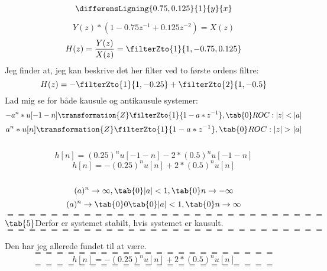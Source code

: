 \begin{Opgaver}
\begin{kapitel}[Z transformation]
\begin{Opgave}
            
        \end{Opgave}
        \begin{Opgave}
            \[\differensLigning{0.75, 0.125}{1}{y}{x}\]            
            \begin{UnderOpgave}
                \[Y(z)*(1 - 0.75z^{-1} + 0.125z^{-2}) = X(z)\]
                \[H(z) = \frac{Y(z)}{X(z)} = \filterZto{1}{1, -0.75, 0.125}\]
                Jeg finder at, jeg kan beskrive det her filter ved to første ordens filtre: 
                \[H(z) = -\filterZto{1}{1, -0.25} + \filterZto{2}{1, -0.5}\]
                Lad mig se for både kausule og antikausule systemer: 
                \[-a^n*u[-1-n]  \transformation{Z} \filterZto{1}{1 - a*z^{-1}},\tab{0} ROC: |z| < |a|\]
                \[ a^n*u[n]     \transformation{Z} \filterZto{1}{1 - a*z^{-1}}, \tab{0} ROC: |z| > |a|\]\\
                \[h[n] = (0.25)^nu[-1-n] - 2*(0.5)^nu[-1-n]\]
                \[h[n] = -(0.25)^nu[n] + 2*(0.5)^nu[n]\]\\
                \[(a)^n \rightarrow \infty, \tab{0} |a| < 1,\tab{0} n \rightarrow -\infty\]
                \[(a)^n \rightarrow \tab{0} 0 \tab{0} |a| < 1, \tab{0} n \rightarrow \infty\]
                \[=============================\]
                $\tab{5}$Derfor er systemet stabilt, hvis systemet er kausult.
                \[=============================\]
            \end{UnderOpgave}

            \begin{UnderOpgave}
                Den har jeg allerede fundet til at være.
                \[======================\]
                \[h[n] = -(0.25)^nu[n] + 2*(0.5)^nu[n]\]
                \[======================\]
            \end{UnderOpgave}


\end{Opgave}
\end{kapitel}
\end{Opgaver}
